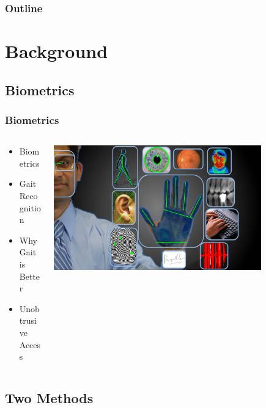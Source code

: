 \documentclass{beamer}
\begin{document}
\begin{frame}
  \frametitle{Outline}
  \tableofcontents[hideallsubsections]
\end{frame}





\section[Mobile Security]{Background}

\subsection{Biometrics}
\begin{frame}
  \frametitle{Biometrics}

  \begin{columns}
  \begin{column}{0.4\textwidth}
  \begin{itemize}
    \item Biometrics 
  	\linebreak
  	\item Gait Recognition
  	\linebreak
	\item Why Gait is Better
	\linebreak
	\item Unobtrusive Access
  \end{itemize}
  \end{column}
  \begin{column}{0.8\textwidth}
   \includegraphics[width=0.8\textwidth]{Illustrations/allbiometrics.jpg}
  \end{column}
  \end{columns}
\end{frame}

\subsection{Two Methods}
\end{document}
